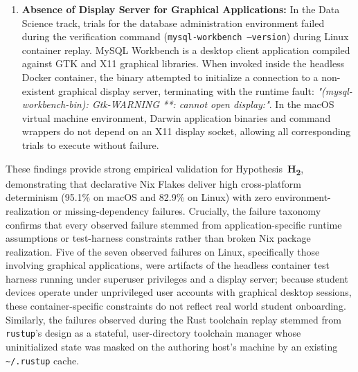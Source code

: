 \begin{enumerate}
	\item \textbf{Absence of Display Server for Graphical Applications:} In the
	      Data Science track, trials for the database administration environment failed
	      during the verification command (\texttt{mysql-workbench --version})
	      during Linux container replay. MySQL Workbench is a desktop client application
	      compiled against GTK and X11 graphical libraries. When invoked inside
	      the headless Docker container, the binary attempted to initialize a connection
	      to a non-existent graphical display server, terminating with the runtime
	      fault: \textit{"(mysql-workbench-bin): Gtk-WARNING **: cannot open
		      display:"}. In the macOS virtual machine environment, Darwin application
	      binaries and command wrappers do not depend on an X11 display socket, allowing
	      all corresponding trials to execute without failure.
\end{enumerate}

These findings provide strong empirical validation for Hypothesis~\textbf{H\textsubscript{2}},
demonstrating that declarative Nix Flakes deliver high cross-platform
determinism (95.1\% on macOS and 82.9\% on Linux) with zero environment-realization
or missing-dependency failures. Crucially, the failure taxonomy confirms that
every observed failure stemmed from application-specific runtime assumptions or
test-harness constraints rather than broken Nix package realization. Five of the seven
observed failures on Linux, specifically those involving graphical applications, were
artifacts of the headless container test harness running under superuser privileges
and a display server; because student devices operate under unprivileged user
accounts with graphical desktop sessions, these container-specific constraints do
not reflect real world student onboarding. Similarly, the failures observed during
the Rust toolchain replay stemmed from \texttt{rustup}'s design as a stateful, user-directory
toolchain manager whose uninitialized state was masked on the authoring host's machine
by an existing \texttt{\textasciitilde/.rustup} cache.
